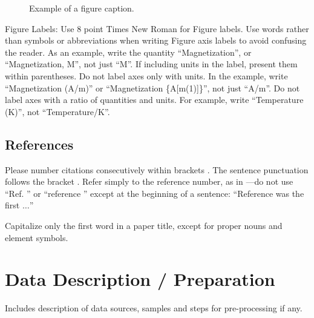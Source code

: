 \documentclass[conference]{IEEEtran}
\begin{document}
	\begin{figure}[htbp]
		\caption{Example of a figure caption.}
		\label{fig}
	\end{figure}
	
	Figure Labels: Use 8 point Times New Roman for Figure labels. Use words 
	rather than symbols or abbreviations when writing Figure axis labels to 
	avoid confusing the reader. As an example, write the quantity 
	``Magnetization'', or ``Magnetization, M'', not just ``M''. If including 
	units in the label, present them within parentheses. Do not label axes only 
	with units. In the example, write ``Magnetization (A/m)'' or ``Magnetization 
	\{A[m(1)]\}'', not just ``A/m''. Do not label axes with a ratio of 
	quantities and units. For example, write ``Temperature (K)'', not 
	``Temperature/K''.
	
	\subsection{References}
	
	Please number citations consecutively within brackets \cite{b1}. The 
	sentence punctuation follows the bracket \cite{b2}. Refer simply to the reference 
	number, as in \cite{b3}---do not use ``Ref. \cite{b3}'' or ``reference \cite{b3}'' except at 
	the beginning of a sentence: ``Reference \cite{b3} was the first $\ldots$''
	
	Capitalize only the first word in a paper title, except for proper nouns and 
	element symbols.
	
	\section{Data Description / Preparation}
	{\color{blue}Includes description of data sources, samples and steps for pre-processing if any.}
\end{document}
